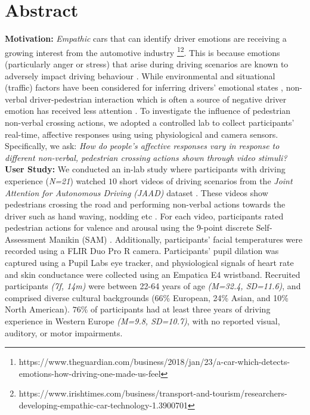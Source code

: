 \documentclass[acmlarge]{acmart}
\begin{document}
\section*{Abstract}
\textbf{Motivation:} \textit{Empathic} cars that can identify driver emotions are receiving a growing interest from the automotive industry \footnote{https://www.theguardian.com/business/2018/jan/23/a-car-which-detects-emotions-how-driving-one-made-us-feel}\footnote{https://www.irishtimes.com/business/transport-and-tourism/researchers-developing-empathic-car-technology-1.3900701}. This is because emotions (particularly anger or stress) that arise during driving scenarios are known to adversely impact driving behaviour \cite{2015:tf:jeon}. While environmental and situational (traffic) factors have been considered for inferring drivers' emotional states \cite{2018:frontiers:habibovic, 2019:MTI:braun, jeon2016don}, non-verbal driver-pedestrian interaction which is often a source of negative driver emotion has received less attention \cite{zepf2019towards} . To investigate the influence of pedestrian non-verbal crossing actions, we adopted a controlled lab to collect participants' real-time, affective responses using using physiological and camera sensors. Specifically, we ask: \textit{How do people's affective responses vary in response to different non-verbal, pedestrian crossing actions shown through video stimuli?}
\\


\noindent \textbf{User Study:}  
We conducted an in-lab study where participants with driving experience (\textit{N=21}) watched $10$ short videos of driving scenarios from the \textit{Joint Attention for Autonomous Driving (JAAD)} dataset \cite{2017:IV:rasouli, Ghosh2022}. These videos show pedestrians crossing the road and performing non-verbal actions towards the driver such as hand waving, nodding etc \cite{2016:arxiv:jaad}. For each video, participants rated pedestrian actions for valence and arousal using the 9-point discrete Self-Assessment Manikin (SAM) \cite{bradley1994measuring}. Additionally, participants' facial temperatures were recorded using a FLIR Duo Pro R camera. Participants' pupil dilation was captured using a Pupil Labs eye tracker, and physiological signals of heart rate and skin conductance were collected using an Empatica E4 wristband. Recruited participants \textit{(7f, 14m)} were between 22-64 years of age \textit{(M=32.4, SD=11.6)}, and comprised diverse cultural backgrounds (66\% European, 24\% Asian, and 10\% North American). $76\%$ of participants had at least three years of driving experience in Western Europe \textit{(M=9.8, SD=10.7)}, with no reported visual, auditory, or motor impairments.
\\
\end{document}
